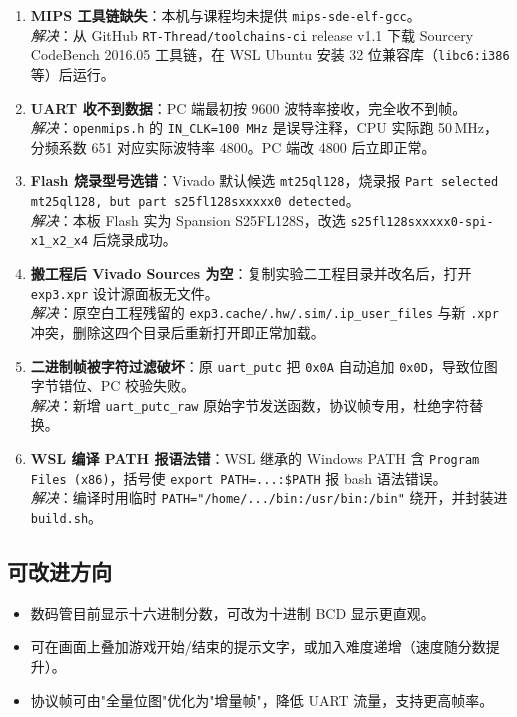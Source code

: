\begin{enumerate}[leftmargin=2em]
    \item \textbf{MIPS 工具链缺失}：本机与课程均未提供 \texttt{mips-sde-elf-gcc}。\\
        \textit{解决}：从 GitHub \texttt{RT-Thread/toolchains-ci} release v1.1 下载 Sourcery CodeBench 2016.05 工具链，在 WSL Ubuntu 安装 32 位兼容库（\texttt{libc6:i386} 等）后运行。

    \item \textbf{UART 收不到数据}：PC 端最初按 9600 波特率接收，完全收不到帧。\\
        \textit{解决}：\texttt{openmips.h} 的 \texttt{IN\_CLK=100\,MHz} 是误导注释，CPU 实际跑 50\,MHz，分频系数 651 对应实际波特率 4800。PC 端改 4800 后立即正常。

    \item \textbf{Flash 烧录型号选错}：Vivado 默认候选 \texttt{mt25ql128}，烧录报 \texttt{Part selected mt25ql128, but part s25fl128sxxxxx0 detected}。\\
        \textit{解决}：本板 Flash 实为 Spansion S25FL128S，改选 \texttt{s25fl128sxxxxx0-spi-x1\_x2\_x4} 后烧录成功。

    \item \textbf{搬工程后 Vivado Sources 为空}：复制实验二工程目录并改名后，打开 \texttt{exp3.xpr} 设计源面板无文件。\\
        \textit{解决}：原空白工程残留的 \texttt{exp3.cache/.hw/.sim/.ip\_user\_files} 与新 \texttt{.xpr} 冲突，删除这四个目录后重新打开即正常加载。

    \item \textbf{二进制帧被字符过滤破坏}：原 \texttt{uart\_putc} 把 \texttt{0x0A} 自动追加 \texttt{0x0D}，导致位图字节错位、PC 校验失败。\\
        \textit{解决}：新增 \texttt{uart\_putc\_raw} 原始字节发送函数，协议帧专用，杜绝字符替换。

    \item \textbf{WSL 编译 PATH 报语法错}：WSL 继承的 Windows PATH 含 \texttt{Program Files (x86)}，括号使 \texttt{export PATH=...:\$PATH} 报 bash 语法错误。\\
        \textit{解决}：编译时用临时 \texttt{PATH="/home/.../bin:/usr/bin:/bin"} 绕开，并封装进 \texttt{build.sh}。
\end{enumerate}

\subsection{可改进方向}

\begin{itemize}[leftmargin=2em]
    \item 数码管目前显示十六进制分数，可改为十进制 BCD 显示更直观。
    \item 可在画面上叠加游戏开始/结束的提示文字，或加入难度递增（速度随分数提升）。
    \item 协议帧可由"全量位图"优化为"增量帧"，降低 UART 流量，支持更高帧率。
\end{itemize}
